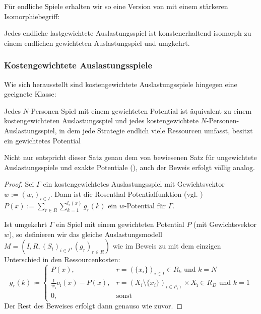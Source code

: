 Für endliche Spiele erhalten wir so eine Version von  mit einem stärkeren Isomorphiebegriff:

\begin{kor}\label{kor:endlLastGewAuslIsomGewAusl}
	Jedes endliche lastgewichtete Auslastungsspiel ist konstenerhaltend isomorph zu einem endlichen gewichteten Auslastungspiel und umgkehrt.
\end{kor}


\subsubsection{Kostengewichtete Auslastungsspiele}

Wie sich herausstellt sind kostengewichtete Auslastungsspiele hingegen eine geeignete Klasse:

\begin{satz}\label{satz:MondererShapleyKostengew}
	Jedes $N$-Personen-Spiel mit einem gewichteten Potential ist äquivalent zu einem kostengewichteten Auslastungsspiel und jedes kostengewichtete $N$-Personen-Auslastungsspiel, in dem jede Strategie endlich viele Ressourcen umfasst, besitzt ein gewichtetes Potential
\end{satz}

Nicht nur entspricht dieser Satz genau dem von \citeauthor{MonShap} bewiesenen Satz für ungewichtete Auslastungsspiele und exakte Potentiale (), auch der Beweis erfolgt völlig analog. 

\begin{proof}
	Sei $\Gamma$ ein kostengewichtetes Auslastungsspiel mit Gewichtsvektor $w := (w_i)_{i\in I}$. Dann ist die Rosenthal-Potentialfunktion (vgl. \cite{RosenthalPotential}) $P(x) := \sum_{r \in R}\sum_{k=1}^{l_r(x)}g_r(k)$ ein $w$-Potential für $\Gamma$.
		
	Ist umgekehrt $\Gamma$ ein Spiel mit einem gewichteten Potential $P$ (mit Gewichtsvektor $w$), so definieren wir das gleiche Auslastungsmodell $M = (I, R, (S_i)_{i \in I}, (g_r)_{r \in R})$ wie im Beweis zu  mit dem einzigen Unterschied in den Ressourcenkosten:
		\[g_r(k) \coloneqq 
		\begin{cases}
		P(x), 									&r = \left(\{x_i\}\right)_{i \in I} \in R_k 													\text{ und } k=N \\
		\frac{1}{w_{\hat{\imath}}}c_{\hat{\imath}}(x) - P(x), 	&r = \left(X_i\setminus\{x_i\}\right)_{i \in I\setminus\hat{\imath}} \times X_{\hat{\imath}} \in R_D 	\text{ und } k=1 \\
		0,										&\text{sonst}
		\end{cases}\]
	Der Rest des Beweises erfolgt dann genauso wie zuvor.
\end{proof}

